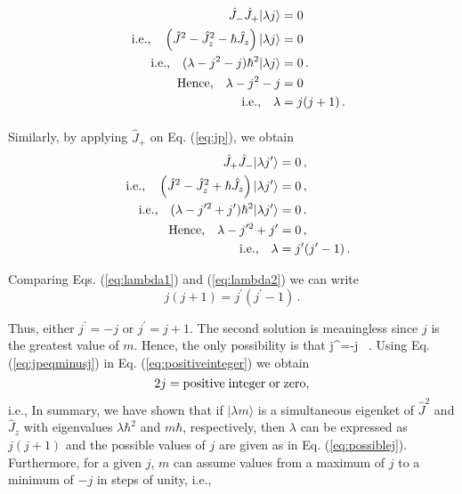 \begin{align}
	\hat{J}_{-}\hat{J}_{+} |\lambda j\rangle &= 0   \nonumber\\
	\qq{i.e.,} \left( \hat{J}^2-\hat{J}_z^2 - \hbar\hat{J}_z\right)|\lambda j\rangle &= 0  \nonumber\\
	\qq{i.e.,}	(\lambda-j^2-j)\hbar^2 |\lambda j\rangle &= 0 \, . \\
	\qq{Hence,} \lambda - j^2-j &= 0 \nonumber\\
	\qq{i.e.,} \lambda &= j(j+1) \, .
	\label{eq:lambda1}
\end{align}


\paragraph{}
Similarly, by applying $\hat{J}_{+}$ on Eq. (\ref{eq:jp}), we obtain
\begin{align}
 \hat{J}_{+}\hat{J}_{-} |\lambda j^{\prime}\rangle &= 0 \, , \nonumber\\
\qq{i.e.,}  \left( \hat{J}^2-\hat{J}_z^2 + \hbar\hat{J}_z\right)|\lambda j^{\prime}\rangle &= 0 \, , \nonumber\\
\qq{i.e.,} (\lambda-j^{\prime 2}+j^{\prime})\hbar^2 |\lambda j^{\prime}\rangle &= 0 \, . \\
\qq{Hence,}\lambda - j^{\prime 2}+j^{\prime} &= 0\, , \nonumber\\
\qq{i.e.,} \lambda &= j^{\prime}(j^{\prime}-1) \, .
\label{eq:lambda2}
\end{align}


Comparing Eqs. (\ref{eq:lambda1}) and (\ref{eq:lambda2}) we can write
\begin{equation*}
j(j+1) = j^{\prime}(j^{\prime}-1) \, . 
\end{equation*}

Thus, either $j^{\prime}=-j$ or $j^{\prime}=j+1$. The second solution is meaningless since $j$ is the greatest value of $m$.
Hence, the only possibility is that
\be
j^{\prime}=-j \, .
\label{eq:jpeqminusj}
\ee
Using Eq. (\ref{eq:jpeqminusj}) in Eq. (\ref{eq:positiveinteger}) we obtain
\[ 2j= {\rm positive\; integer\; or\; zero}, \]
i.e.,
\be
{}
\label{eq:possiblej}
\ee
In summary, we have shown that if $|\lambda m\rangle$ is a simultaneous eigenket of $\hat{J}^2$ and $\hat{J}_z$ with eigenvalues $\lambda \hbar^2$ and $m\hbar$, respectively, then $\lambda$ can be expressed as $j(j+1)$ and the possible values of $j$
are given as in Eq. (\ref{eq:possiblej}). Furthermore, for a given $j$, $m$ can assume values from a maximum of $j$ to a minimum of $-j$ in steps of unity, i.e.,
\be
{}
\ee

